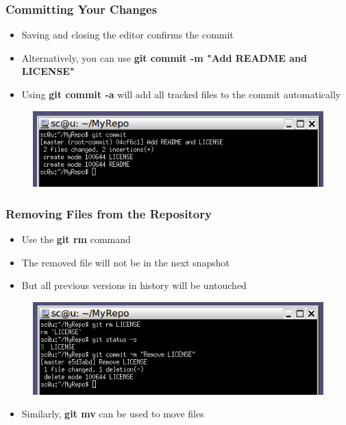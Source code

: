 \documentclass{beamer}
\begin{document}
\begin{frame}
	\frametitle{Committing Your Changes}
	\begin{itemize}
		\item{Saving and closing the editor confirms the commit}
		\item{Alternatively, you can use \textbf{git commit -m "Add README and LICENSE"}}
		\item{Using \textbf{git commit -a} will add all tracked files to the commit automatically}
	\end{itemize}
	\begin{figure}
		\includegraphics[scale=0.62]{Committing_Your_Changes-1.png}
	\end{figure}
\end{frame}

\begin{frame}
	\frametitle{Removing Files from the Repository}
	\begin{itemize}
		\item{Use the \textbf{git rm} command}
		\item{The removed file will not be in the next snapshot}
		\item{But all previous versions in history will be untouched}
	\end{itemize}
	\begin{figure}
		\includegraphics[scale=0.62]{Removing_Files_from_the_Repository-0.png}
	\end{figure}
	\begin{itemize}
		\item{Similarly, \textbf{git mv} can be used to move files}
	\end{itemize}
\end{frame}
\end{document}
